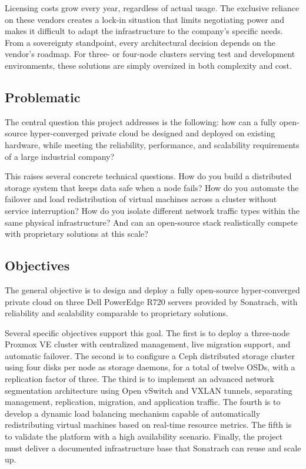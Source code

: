\documentclass[12pt, a4paper]{article}
\begin{document}
Licensing costs grow every year, regardless of actual usage. The exclusive reliance on these vendors creates a lock-in situation that limits negotiating power and makes it difficult to adapt the infrastructure to the company's specific needs. From a sovereignty standpoint, every architectural decision depends on the vendor's roadmap. For three- or four-node clusters serving test and development environments, these solutions are simply oversized in both complexity and cost.

\subsection{Problematic}

The central question this project addresses is the following: how can a fully open-source hyper-converged private cloud be designed and deployed on existing hardware, while meeting the reliability, performance, and scalability requirements of a large industrial company?

This raises several concrete technical questions. How do you build a distributed storage system that keeps data safe when a node fails? How do you automate the failover and load redistribution of virtual machines across a cluster without service interruption? How do you isolate different network traffic types within the same physical infrastructure? And can an open-source stack realistically compete with proprietary solutions at this scale?

\subsection{Objectives}

The general objective is to design and deploy a fully open-source hyper-converged private cloud on three Dell PowerEdge R720 servers provided by Sonatrach, with reliability and scalability comparable to proprietary solutions.

Several specific objectives support this goal. The first is to deploy a three-node Proxmox VE cluster with centralized management, live migration support, and automatic failover. The second is to configure a Ceph distributed storage cluster using four disks per node as storage daemons, for a total of twelve OSDs, with a replication factor of three. The third is to implement an advanced network segmentation architecture using Open vSwitch and VXLAN tunnels, separating management, replication, migration, and application traffic. The fourth is to develop a dynamic load balancing mechanism capable of automatically redistributing virtual machines based on real-time resource metrics. The fifth is to validate the platform with a high availability scenario. Finally, the project must deliver a documented infrastructure base that Sonatrach can reuse and scale up.
\end{document}
